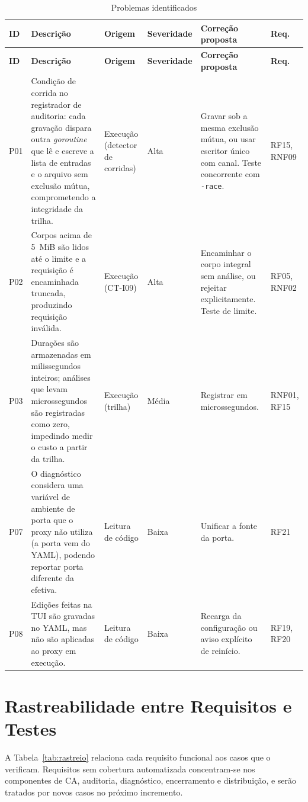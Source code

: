 {\small
\begin{longtable}{|p{0.95cm}|p{5.0cm}|p{1.5cm}|p{1.7cm}|p{3.1cm}|p{1.2cm}|}
\caption{Problemas identificados}\label{tab:problemas}\\
\hline
\textbf{ID} & \textbf{Descrição} & \textbf{Origem} & \textbf{Severidade} & \textbf{Correção proposta} & \textbf{Req.} \\ \hline
\endfirsthead
\hline
\textbf{ID} & \textbf{Descrição} & \textbf{Origem} & \textbf{Severidade} & \textbf{Correção proposta} & \textbf{Req.} \\ \hline
\endhead
P01 & Condição de corrida no registrador de auditoria: cada gravação dispara outra \textit{goroutine} que lê e escreve a lista de entradas e o arquivo sem exclusão mútua, comprometendo a integridade da trilha. & Execução (detector de corridas) & Alta & Gravar sob a mesma exclusão mútua, ou usar escritor único com canal. Teste concorrente com \texttt{-race}. & RF15, RNF09 \\ \hline
P02 & Corpos acima de 5~MiB são lidos até o limite e a requisição é encaminhada truncada, produzindo requisição inválida. & Execução (CT-I09) & Alta & Encaminhar o corpo integral sem análise, ou rejeitar explicitamente. Teste de limite. & RF05, RNF02 \\ \hline
P03 & Durações são armazenadas em milissegundos inteiros; análises que levam microssegundos são registradas como zero, impedindo medir o custo a partir da trilha. & Execução (trilha) & Média & Registrar em microssegundos. & RNF01, RF15 \\ \hline
P07 & O diagnóstico considera uma variável de ambiente de porta que o proxy não utiliza (a porta vem do YAML), podendo reportar porta diferente da efetiva. & Leitura de código & Baixa & Unificar a fonte da porta. & RF21 \\ \hline
P08 & Edições feitas na TUI são gravadas no YAML, mas não são aplicadas ao proxy em execução. & Leitura de código & Baixa & Recarga da configuração ou aviso explícito de reinício. & RF19, RF20 \\ \hline
\end{longtable}
}
\noindent{}

\section{Rastreabilidade entre Requisitos e Testes}

A Tabela~\ref{tab:rastreio} relaciona cada requisito funcional aos casos que o verificam. Requisitos sem cobertura automatizada concentram-se nos componentes de CA, auditoria, diagnóstico, encerramento e distribuição, e serão tratados por novos casos no próximo incremento.

